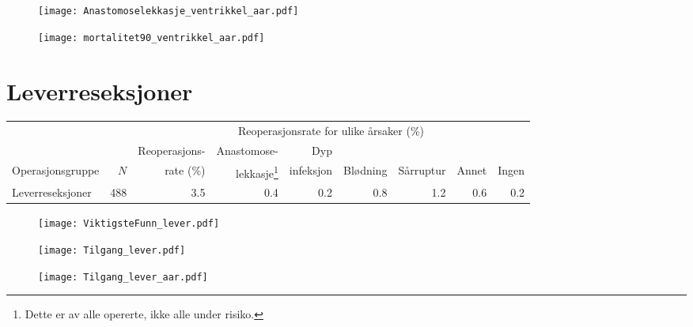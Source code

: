 \documentclass[norsk,a4paper]{article}\usepackage[]{graphicx}\usepackage[]{color}
\begin{document}
\begin{figure}[ht]
\centering
\texttt{[image: Anastomoselekkasje\_ventrikkel\_aar.pdf]}
\caption{}
\end{figure}

\begin{figure}[ht]
\centering
\texttt{[image: mortalitet90\_ventrikkel\_aar.pdf]}
\caption{}
\end{figure}

\clearpage


%
%

\section{Leverreseksjoner}

\begin{table}[htb]
\begin{minipage}{\textwidth}
\centering
\begin{tabular}{lrrrrrrrr}
  \toprule
  & & & \multicolumn{4}{c}{Reoperasjonsrate for ulike årsaker (\%)} \\
 \cline{4-9} 
 & & Reoperasjons- & Anastomose- & Dyp &&&&  \\
 Operasjonsgruppe & $N$ & rate (\%) & lekkasje\footnote[2]{Dette er av alle opererte, ikke
alle under risiko.} & infeksjon & Blødning & Sårruptur & Annet & Ingen \\
 \midrule
Leverreseksjoner & 488 & 3.5 & 0.4 & 0.2 & 0.8 & 1.2 & 0.6 & 0.2 \\ 
   \bottomrule
\end{tabular}

\end{minipage}
\end{table}




\begin{figure}[ht]
\centering
\texttt{[image: ViktigsteFunn\_lever.pdf]}
\caption{}
\end{figure}

\begin{figure}[ht]
\centering
\texttt{[image: Tilgang\_lever.pdf]}
\caption{}
\end{figure}

\begin{figure}[ht]
\centering
\texttt{[image: Tilgang\_lever\_aar.pdf]}
\caption{}
\end{figure}
\end{document}
